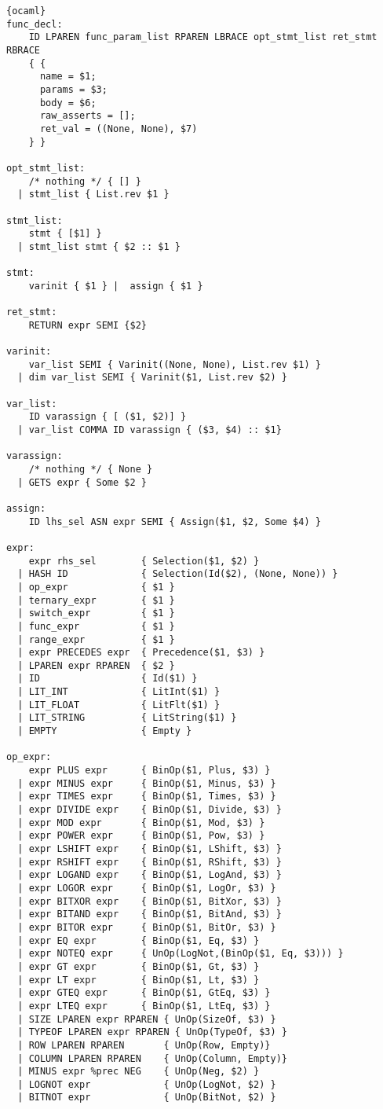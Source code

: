\begin{lstlisting}{ocaml}
func_decl:
    ID LPAREN func_param_list RPAREN LBRACE opt_stmt_list ret_stmt RBRACE
    { {
      name = $1;
      params = $3;
      body = $6;
      raw_asserts = [];
      ret_val = ((None, None), $7)
    } }

opt_stmt_list:
    /* nothing */ { [] }
  | stmt_list { List.rev $1 }

stmt_list:
    stmt { [$1] }
  | stmt_list stmt { $2 :: $1 }

stmt:
    varinit { $1 } |  assign { $1 }

ret_stmt:
    RETURN expr SEMI {$2}

varinit:
    var_list SEMI { Varinit((None, None), List.rev $1) }
  | dim var_list SEMI { Varinit($1, List.rev $2) }

var_list:
    ID varassign { [ ($1, $2)] }
  | var_list COMMA ID varassign { ($3, $4) :: $1}

varassign:
    /* nothing */ { None }
  | GETS expr { Some $2 }

assign:
    ID lhs_sel ASN expr SEMI { Assign($1, $2, Some $4) }

expr:
    expr rhs_sel        { Selection($1, $2) }
  | HASH ID             { Selection(Id($2), (None, None)) }
  | op_expr             { $1 }
  | ternary_expr        { $1 }
  | switch_expr         { $1 }
  | func_expr           { $1 }
  | range_expr          { $1 }
  | expr PRECEDES expr  { Precedence($1, $3) }
  | LPAREN expr RPAREN  { $2 }
  | ID                  { Id($1) }
  | LIT_INT             { LitInt($1) }
  | LIT_FLOAT           { LitFlt($1) }
  | LIT_STRING          { LitString($1) }
  | EMPTY               { Empty }

op_expr:
    expr PLUS expr      { BinOp($1, Plus, $3) }
  | expr MINUS expr     { BinOp($1, Minus, $3) }
  | expr TIMES expr     { BinOp($1, Times, $3) }
  | expr DIVIDE expr    { BinOp($1, Divide, $3) }
  | expr MOD expr       { BinOp($1, Mod, $3) }
  | expr POWER expr     { BinOp($1, Pow, $3) }
  | expr LSHIFT expr    { BinOp($1, LShift, $3) }
  | expr RSHIFT expr    { BinOp($1, RShift, $3) }
  | expr LOGAND expr    { BinOp($1, LogAnd, $3) }
  | expr LOGOR expr     { BinOp($1, LogOr, $3) }
  | expr BITXOR expr    { BinOp($1, BitXor, $3) }
  | expr BITAND expr    { BinOp($1, BitAnd, $3) }
  | expr BITOR expr     { BinOp($1, BitOr, $3) }
  | expr EQ expr        { BinOp($1, Eq, $3) }
  | expr NOTEQ expr     { UnOp(LogNot,(BinOp($1, Eq, $3))) }
  | expr GT expr        { BinOp($1, Gt, $3) }
  | expr LT expr        { BinOp($1, Lt, $3) }
  | expr GTEQ expr      { BinOp($1, GtEq, $3) }
  | expr LTEQ expr      { BinOp($1, LtEq, $3) }
  | SIZE LPAREN expr RPAREN { UnOp(SizeOf, $3) }
  | TYPEOF LPAREN expr RPAREN { UnOp(TypeOf, $3) }
  | ROW LPAREN RPAREN       { UnOp(Row, Empty)}
  | COLUMN LPAREN RPAREN    { UnOp(Column, Empty)}
  | MINUS expr %prec NEG    { UnOp(Neg, $2) }
  | LOGNOT expr             { UnOp(LogNot, $2) }
  | BITNOT expr             { UnOp(BitNot, $2) }


\end{lstlisting}
